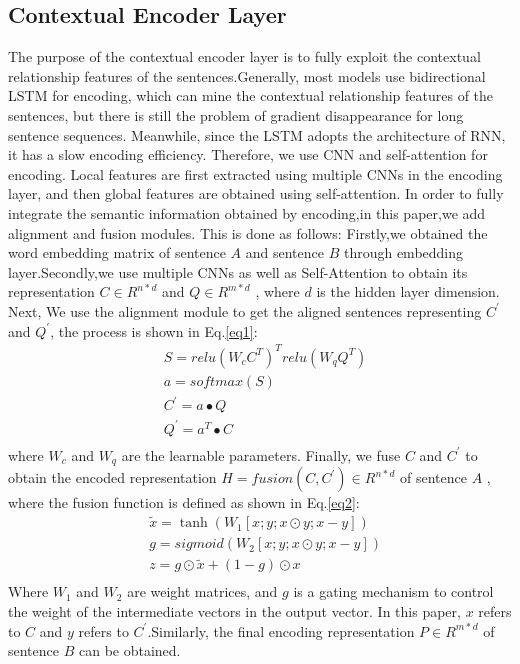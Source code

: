 \documentclass[review]{elsarticle}
\begin{document}
\subsection{Contextual Encoder Layer}
The purpose of the contextual encoder layer is to fully exploit the contextual relationship features of the sentences.Generally, most models use bidirectional LSTM for encoding\cite{wang2017bilateral}\cite{chen2017enhanced}, which can mine the contextual relationship features of the sentences, but there is still the problem of gradient disappearance for long sentence sequences. Meanwhile, since the LSTM adopts the architecture of RNN, 
it has a slow encoding efficiency. Therefore, we use CNN and self-attention for encoding. Local features are first extracted using multiple CNNs in the encoding layer, and then global features are obtained using self-attention. In order to fully integrate the semantic information obtained by encoding,in this paper,we add alignment and fusion modules. This is done as  follows: Firstly,we obtained the word embedding matrix of sentence $A$ and sentence $B$ through embedding layer.Secondly,we  use multiple CNNs as well as Self-Attention to obtain its representation $C \in {R^{n*d}}$ and $Q \in {R^{m*d}}$ , where $d$ is the hidden layer dimension. Next, We use the alignment module to get the aligned sentences representing ${C^{'}}$ and ${Q^{'}}$, the process is shown in Eq.\ref{eq1}:
\begin{equation}\label{eq1}
\begin{aligned}
    & S=relu{{({{W}_{c}}{{C}^{T}})}^{T}}relu({{W}_{q}}{{Q}^{T}}) \\ 
 & a=softmax(S) \\ 
 & {{C}^{'}}=a\bullet Q \\ 
 & {{Q}^{'}}={{a}^{T}}\bullet C \\ 
\end{aligned}
\end{equation}
where ${W_c}$ and ${W_q}$  are the learnable parameters. Finally, we fuse $C$ and ${{C}^{'}}$ to obtain the encoded representation $H=fusion(C,{{C}^{'}})\in {{R}^{n*d}}$ of sentence $A$ , where the fusion function is defined as shown in Eq.\ref{eq2}:
\begin{equation}\label{eq2}
\begin{aligned}
    & \widetilde{x}=\tanh ({{W}_{1}}[x;y;x\odot y;x-y]) \\ 
 & g=sigmoid({{W}_{2}}[x;y;x\odot y;x-y]) \\ 
 & z=g\odot \widetilde{x}+(1-g)\odot x \\ 
\end{aligned}
\end{equation}
Where ${{W}_{1}}$ and ${{W}_{2}}$  are weight matrices, and $g$ is a gating mechanism to control the weight of the intermediate vectors in the output vector. In this paper, $x$ refers to $C$ and $y$ refers to ${{C}^{'}}$.Similarly, the final encoding representation $P\in {{R}^{m*d}}$ of sentence $B$ can be obtained.
\end{document}
